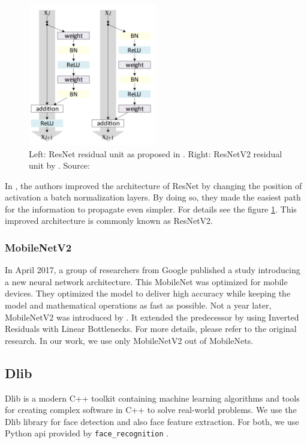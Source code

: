 \begin{figure}
    \centering
    \includegraphics[width=0.5\textwidth]{img/resnetv2.png}
    \caption[Residual units]{Left: ResNet residual unit as proposed in \citep{resnet}. Right: ResNetV2 residual unit by \citep{resnetv2}. Source: \cite{resnetv2}}
    \label{fig:resnetv2}
\end{figure}

In \citep{resnetv2}, the authors improved the architecture of ResNet by changing the position of activation a batch normalization layers. By doing so, they made the easiest path for the information to propagate even simpler. For details see the figure \ref{fig:resnetv2}. This improved architecture is commonly known as ResNetV2.

\subsubsection*{MobileNetV2}

In April 2017, a group of researchers from Google published a study \citep{mobilenet} introducing a new neural network architecture. This MobileNet was optimized for mobile devices. They optimized the model to deliver high accuracy while keeping the model and mathematical operations as fast as possible. Not a year later, MobileNetV2 was introduced by \cite{mobilenetv2}. It extended the predecessor by using Inverted Residuals with Linear Bottlenecks. For more details, please refer to the original research. In our work, we use only MobileNetV2 out of MobileNets.


\subsection{Dlib}
\label{s:dlib}

Dlib \citep{king2009dlib} is a modern C++ toolkit containing machine learning algorithms and tools for creating complex software in C++ to solve real-world problems. We use the Dlib library for face detection and also face feature extraction. For both, we use Python \acrshort{api} provided by \verb+face_recognition+ \citep{geitgey2016machine}. 

